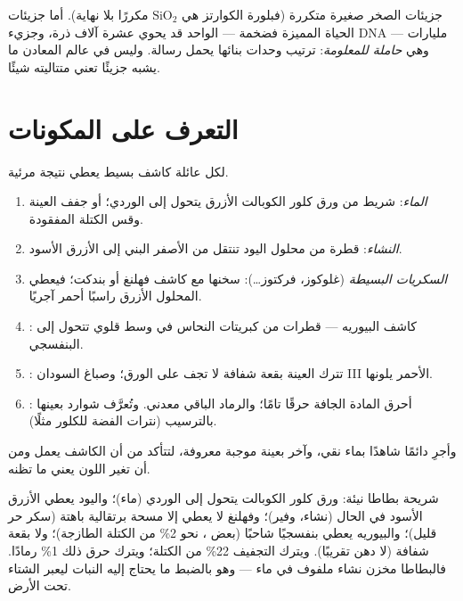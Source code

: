 \begin{remark}\label{rem:g10:chemistry-of-life:macromolecules}
جزيئات الصخر صغيرة متكررة (فبلورة الكوارتز هي $\mathrm{SiO_2}$ مكررًا
بلا نهاية). أما جزيئات الحياة المميزة فضخمة ---  الواحد قد
يحوي عشرة آلاف ذرة، وجزيء DNA مليارات --- وهي \emph{حاملة للمعلومة}:
ترتيب وحدات بنائها يحمل رسالة. وليس في عالم المعادن ما يشبه جزيئًا
تعني متتاليته شيئًا.
\end{remark}

\section{التعرف على المكونات}

\begin{method}\label{met:g10:chemistry-of-life:tests}
لكل عائلة كاشف بسيط يعطي نتيجة مرئية.
\begin{enumerate}
  \item \emph{الماء}: شريط من ورق كلور الكوبالت الأزرق يتحول إلى
        الوردي؛ أو جفف العينة وقس الكتلة المفقودة.
  \item \emph{النشاء}: قطرة من محلول اليود تنتقل من الأصفر البني إلى
        الأزرق الأسود.
  \item \emph{السكريات البسيطة} (غلوكوز، فركتوز\dots): سخنها مع كاشف
        فهلنغ أو بندكت؛ فيعطي المحلول الأزرق راسبًا أحمر آجريًا.
  \item \emph{}: كاشف البيوريه --- قطرات من كبريتات النحاس
        في وسط قلوي تتحول إلى البنفسجي.
  \item \emph{}: تترك العينة بقعة شفافة لا تجف على الورق؛
        وصباغ السودان III الأحمر يلونها.
  \item \emph{}: أحرق المادة الجافة حرقًا تامًا؛
        والرماد الباقي معدني. وتُعرَّف شوارد بعينها بالترسيب (نترات
        الفضة للكلور مثلًا).
\end{enumerate}
وأجرِ دائمًا شاهدًا بماء نقي، وآخر بعينة موجبة معروفة، لتتأكد من أن
الكاشف يعمل ومن أن تغير اللون يعني ما تظنه.
\end{method}

\begin{example}\label{ex:g10:chemistry-of-life:potato}
شريحة بطاطا نيئة: ورق كلور الكوبالت يتحول إلى الوردي (ماء)؛ واليود
يعطي الأزرق الأسود في الحال (نشاء، وفير)؛ وفهلنغ لا يعطي إلا مسحة
برتقالية باهتة (سكر حر قليل)؛ والبيوريه يعطي بنفسجيًا شاحبًا (بعض
، نحو 2\% من الكتلة الطازجة)؛ ولا بقعة شفافة (لا دهن تقريبًا).
ويترك التجفيف 22\% من الكتلة؛ ويترك حرق ذلك 1\% رمادًا. فالبطاطا مخزن
نشاء ملفوف في ماء --- وهو بالضبط ما يحتاج إليه النبات ليعبر الشتاء
تحت الأرض.
\end{example}


